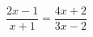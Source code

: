 \begin{ex}[type=equation]
	\begin{condition}
		$\dfrac{2x - 1}{x + 1} = \dfrac{4x + 2}{3x - 2}$
	\end{condition}
\end{ex}